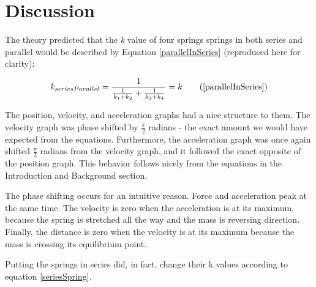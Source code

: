 \documentclass[]{article}
\begin{document}
\section{Discussion}
The theory predicted that the \textit{k} value of four springs springs in both series and parallel would be described by Equation \ref{parallelInSeries} (reproduced here for clarity):

\begin{equation*}
k_{seriesParallel}=\frac{1}{\frac{1}{k_1+k_2} + \frac{1}{k_3+k_4}} = k \tag{\ref{parallelInSeries}}
\end{equation*}

The position, velocity, and acceleration graphs had a nice structure to them. The velocity graph was phase shifted by $ \frac{\pi}{2} $ radians - the exact amount we would have expected from the equations. Furthermore, the acceleration graph was once again shifted $\frac{\pi}{2} $ radians from the velocity graph, and it followed the exact opposite of the position graph. This behavior follows nicely from the equations in the Introduction and Background section.

The phase shifting occurs for an intuitive reason. Force and acceleration peak at the same time. The velocity is zero when the acceleration is at its maximum, because the spring is stretched all the way and the mass is reversing direction. Finally, the distance is zero when the velocity is at its maximum because the mass is crossing its equilibrium point.

Putting the springs in series did, in fact, change their k values according to equation \ref{seriesSpring}.
\end{document}

